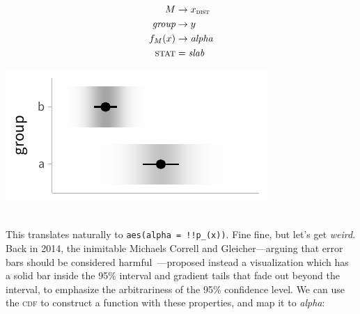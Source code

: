 \documentclass[journal]{vgtc}                     %
\newcommand{\equationfigure}[2]{%
\noindent
\begin{minipage}{.5\columnwidth}
\setlength{\abovedisplayskip}{0pt}
\setlength{\belowdisplayskip}{0pt}
#1\end{minipage}%
\begin{minipage}{.4\columnwidth}\centering #2 \end{minipage}%
\vspace{.5\belowdisplayskip}\\
}
\begin{document}
\equationfigure{
\begin{align*}
M &\rightarrow x_\textsc{dist}\\
\textit{group} &\rightarrow y\\
f_M(x) &\rightarrow \textit{alpha}\\
\textsc{stat} &= \mathit{slab}
\end{align*}
}{\includegraphics[width=1.2\columnwidth]{figs/3-slab_gradient_two_groups.pdf}}
This translates naturally to \texttt{aes(alpha = !!p\_(x))}. Fine fine, but let's get \textit{weird}. Back in 2014, the inimitable Michaels Correll and Gleicher---arguing that error bars should be considered harmful~\cite{correll2014error}---proposed instead a visualization which has a solid bar inside the 95\% interval and gradient tails that fade out beyond the interval, to emphasize the arbitrariness of the 95\% confidence level. We can use the \textsc{cdf} to construct a function with these properties, and map it to \textit{alpha}:
\end{document}
